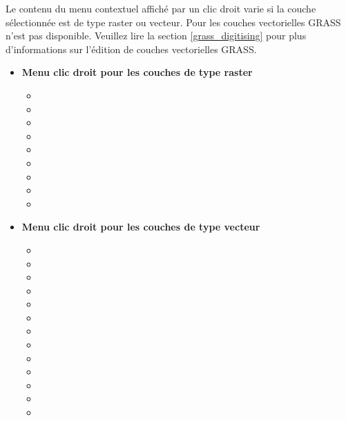 Le contenu du menu contextuel affiché par un clic droit varie si la couche sélectionnée est de type raster ou  vecteur. Pour les couches vectorielles GRASS  n'est pas disponible. Veuillez lire la section \ref{grass_digitising} pour plus d'informations sur l'édition de couches vectorielles GRASS.

\begin{itemize}[label=--]
\item \textbf{Menu clic droit pour les couches de type raster}
\begin{itemize}[label=--]
\item {}
\item {}
\item {}
\item {}
\item {}
\item {}
\item {}
\item {}
\item {}
\end{itemize}

\item \textbf{Menu clic droit pour les couches de type vecteur}
\begin{itemize}[label=--]
\item {}
\item {}
\item {}
\item {}
\item {}
\item {}
\item {}
\item {}
\item {}
\item {}
\item {}
\item {}
\item {}
\end{itemize}


\end{itemize}
